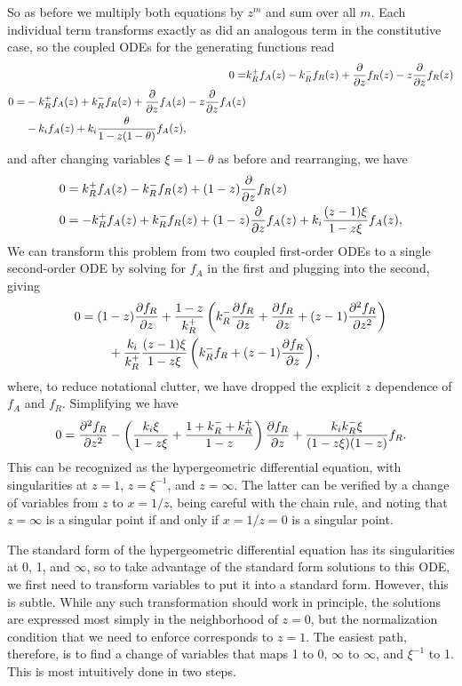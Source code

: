 So as before we multiply both equations by $z^m$ and sum over all $m$.
Each individual term transforms exactly as did an analogous term in
the constitutive case, so the coupled ODEs for the generating functions read
\begin{align}
0 =& k_R^+ f_A(z) - k_R^- f_R(z) + \pderiv{z} f_R(z) - z \pderiv{z} f_R(z)
\\
\begin{split}
0 =&  - k_R^+ f_A(z) + k_R^- f_R(z) + \pderiv{z} f_A(z) - z \pderiv{z} f_A(z)
\\
&- k_i f_A(z) + k_i \frac{\theta}{1-z(1-\theta)} f_A(z),
\end{split}
\end{align}
and after changing variables $\xi = 1 - \theta$ as before
and rearranging, we have
\begin{align}
0 &= k_R^+ f_A(z) - k_R^- f_R(z) + (1-z) \pderiv{z} f_R(z)
\\
0 &=  - k_R^+ f_A(z) + k_R^- f_R(z) + (1 - z) \pderiv{z} f_A(z)
+ k_i \frac{(z-1)\xi}{1-z\xi} f_A(z),
\end{align}
We can transform this problem from two coupled first-order ODEs to a
single second-order ODE by solving for $f_A$ in the first and plugging
into the second, giving
\begin{align}
\begin{split}
0 = (1&-z) \pderiv[f_R]{z}
+ \frac{1-z}{k_R^+}
        \left(k_R^- \pderiv[f_R]{z} + \pderiv[f_R]{z} +(z-1) \psecderiv[f_R]{z}\right)
\\
&+ \frac{k_i}{k_R^+} \frac{(z-1)\xi}{1-z\xi}
        \left(k_R^- f_R + (z-1) \pderiv[f_R]{z}\right),
\end{split}
\end{align}
where, to reduce notational clutter, we have dropped the explicit $z$
dependence of $f_A$ and $f_R$. Simplifying we have
\begin{align}
0 = \psecderiv[f_R]{z}
        - \left(\frac{k_i\xi}{1-z\xi}
                + \frac{1 + k_R^- + k_R^+}{1-z}
        \right)\pderiv[f_R]{z}
        + \frac{k_i k_R^- \xi}{(1-z\xi)(1-z)}f_R.
\end{align}
This can be recognized as the hypergeometric differential equation,
with singularities at $z=1$, $z=\xi^{-1}$, and $z=\infty$. The latter
can be verified by a change of variables from $z$ to $x=1/z$,
being careful with the chain rule, and noting that $z=\infty$ is a
singular point if and only if $x=1/z=0$ is a singular point.

The standard form of the hypergeometric differential equation has its
singularities at 0, 1, and $\infty$, so to take advantage of the
standard form solutions to this ODE, we first need to transform
variables to put it into a standard form.
However, this is subtle. While any such transformation should work in
principle, the solutions are expressed most simply in the neighborhood
of $z=0$, but the normalization condition that we need to enforce
corresponds to $z=1$. The easiest path, therefore, is to find a change
of variables that maps
1 to 0, $\infty$ to $\infty$, and $\xi^{-1}$ to 1.
This is most intuitively done in two steps.

